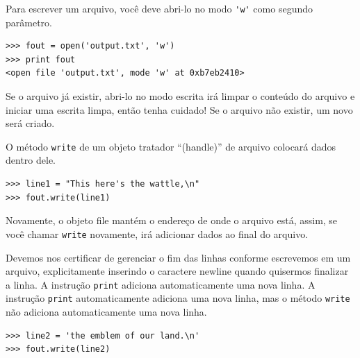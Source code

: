 
Para escrever um arquivo, você deve abri-lo no
modo \verb"'w'" como segundo parâmetro.

\beforeverb
\begin{verbatim}
>>> fout = open('output.txt', 'w')
>>> print fout
<open file 'output.txt', mode 'w' at 0xb7eb2410>
\end{verbatim}
\afterverb

Se o arquivo já existir, abri-lo no modo escrita irá limpar o
conteúdo do arquivo e iniciar uma escrita limpa, então tenha 
cuidado! Se o arquivo não existir, um novo será criado.

O método {\tt write} de um objeto tratador ``(handle)'' de 
arquivo colocará dados dentro dele.

\beforeverb
\begin{verbatim}
>>> line1 = "This here's the wattle,\n"
>>> fout.write(line1)
\end{verbatim}
\afterverb


Novamente, o objeto file mantém o endereço de onde o arquivo 
está, assim, se você chamar {\tt write} novamente, irá adicionar
dados ao final do arquivo.

Devemos nos certificar de gerenciar o fim das linhas conforme
escrevemos em um arquivo, explicitamente inserindo o caractere
newline quando quisermos finalizar a linha. A instrução {\tt print}
adiciona automaticamente uma nova linha. A instrução {\tt print}
automaticamente adiciona uma nova linha, mas o método {\tt write}
não adiciona automaticamente uma nova linha.

\beforeverb
\begin{verbatim}
>>> line2 = 'the emblem of our land.\n'
>>> fout.write(line2)
\end{verbatim}
\afterverb

